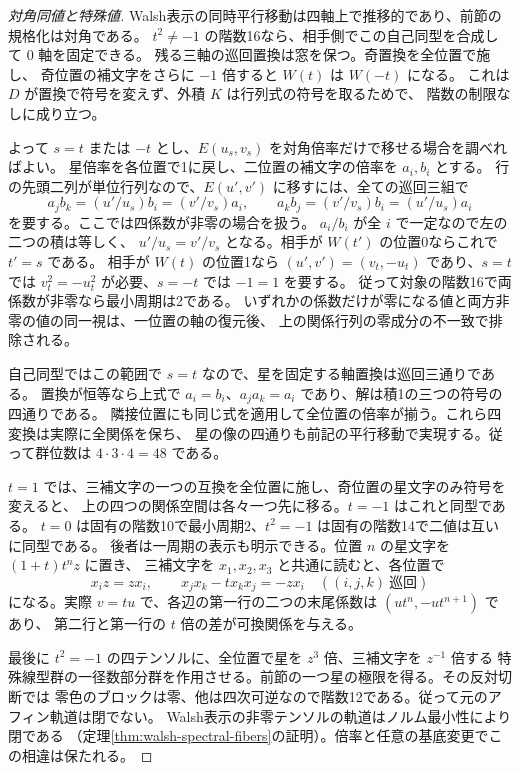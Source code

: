 \begin{proof}[対角同値と特殊値]
Walsh表示の同時平行移動は四軸上で推移的であり、前節の規格化は対角である。
$t^2\ne-1$ の階数16なら、相手側でこの自己同型を合成して $0$ 軸を固定できる。
残る三軸の巡回置換は窓を保つ。奇置換を全位置で施し、
奇位置の補文字をさらに $-1$ 倍すると $W(t)$ は $W(-t)$ になる。
これは $D$ が置換で符号を変えず、外積 $K$ は行列式の符号を取るためで、
階数の制限なしに成り立つ。

よって $s=t$ または $-t$ とし、$E(u_s,v_s)$ を対角倍率だけで移せる場合を調べればよい。
星倍率を各位置で1に戻し、二位置の補文字の倍率を $a_i,b_i$ とする。
行の先頭二列が単位行列なので、$E(u',v')$ に移すには、全ての巡回三組で
\[
 a_j b_k=(u'/u_s)b_i=(v'/v_s)a_i,\qquad
 a_k b_j=(v'/v_s)b_i=(u'/u_s)a_i
\]
を要する。ここでは四係数が非零の場合を扱う。
$a_i/b_i$ が全 $i$ で一定なので左の二つの積は等しく、
$u'/u_s=v'/v_s$ となる。相手が $W(t')$ の位置0ならこれで $t'=s$ である。
相手が $W(t)$ の位置1なら $(u',v')=(v_t,-u_t)$ であり、$s=t$ では
$v_t^2=-u_t^2$ が必要、$s=-t$ では $-1=1$ を要する。
従って対象の階数16で両係数が非零なら最小周期は2である。
いずれかの係数だけが零になる値と両方非零の値の同一視は、一位置の軸の復元後、
上の関係行列の零成分の不一致で排除される。

自己同型ではこの範囲で $s=t$ なので、星を固定する軸置換は巡回三通りである。
置換が恒等なら上式で $a_i=b_i$、$a_ja_k=a_i$ であり、解は積1の三つの符号の四通りである。
隣接位置にも同じ式を適用して全位置の倍率が揃う。これら四変換は実際に全関係を保ち、
星の像の四通りも前記の平行移動で実現する。従って群位数は $4\cdot3\cdot4=48$ である。

$t=1$ では、三補文字の一つの互換を全位置に施し、奇位置の星文字のみ符号を変えると、
上の四つの関係空間は各々一つ先に移る。$t=-1$ はこれと同型である。
$t=0$ は固有の階数10で最小周期2、$t^2=-1$ は固有の階数14で二値は互いに同型である。
後者は一周期の表示も明示できる。位置 $n$ の星文字を $(1+t)t^n z$ に置き、
三補文字を $x_1,x_2,x_3$ と共通に読むと、各位置で
\[
          x_i z=z x_i,\qquad x_jx_k-tx_kx_j=-z x_i
              \quad ((i,j,k)\ \text{巡回})
\]
になる。実際 $v=tu$ で、各辺の第一行の二つの末尾係数は $(ut^n,-ut^{n+1})$ であり、
第二行と第一行の $t$ 倍の差が可換関係を与える。

最後に $t^2=-1$ の四テンソルに、全位置で星を $z^3$ 倍、三補文字を $z^{-1}$ 倍する
特殊線型群の一径数部分群を作用させる。前節の一つ星の極限を得る。その反対切断では
零色のブロックは零、他は四次可逆なので階数12である。従って元のアフィン軌道は閉でない。
Walsh表示の非零テンソルの軌道はノルム最小性により閉である
（定理\ref{thm:walsh-spectral-fibers}の証明）。倍率と任意の基底変更でこの相違は保たれる。
\end{proof}
